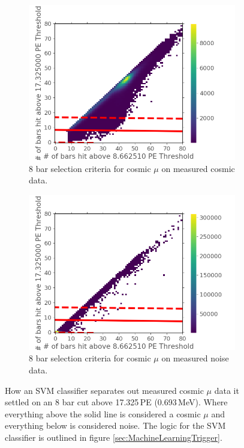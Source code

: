 \begin{figure}[htbp]
\centering
\begin{subfigure}{.5\textwidth}
  \centering
  \includegraphics[width=\linewidth]{Chapter5/Figs/Raster/Cosmic8BarSignalCutSVM.png}
  \captionsetup{width=.9\linewidth}
  \caption{8 bar selection criteria for cosmic $\mu$ on measured cosmic data.}
  \label{subFig:cosmic8BarSignalCutSVM}
\end{subfigure}%
\begin{subfigure}{.5\textwidth}
  \centering
\includegraphics[width=\linewidth]{Chapter5/Figs/Raster/Cosmic8BarNoiseCutSVM.png}
  \captionsetup{width=.9\linewidth}
  \caption{8 bar selection criteria for cosmic $\mu$ on measured noise data.}
  \label{subFig:cosmic8BarNoiseCutSVM}
\end{subfigure}
\caption{How an SVM classifier separates out measured cosmic $\mu$ data it settled on an 8 bar cut above 17.325\,PE (0.693\,MeV). Where everything above the solid line is considered a cosmic $\mu$ and everything below is considered noise. The logic for the SVM classifier is outlined in figure \ref{sec:MachineLearningTrigger}.}
\label{fig:cosmic8BarSignalNoiseCutSVM}
\end{figure}

